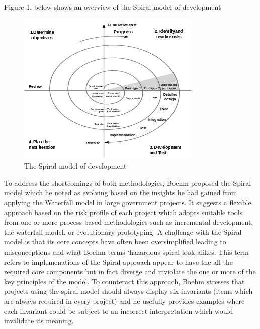 \documentclass[a4paper,12pt]{article}
\begin{document}
\begin{samepage}
\begin{samepage}
Figure 1. below shows an overview of the Spiral model of development

 \begin{figure}[h!]
  \includegraphics{spiralmodel.png}
  \caption{The Spiral model of development}
  \label{fig:spiral_model}
\end{figure}

To address the shortcomings of both methodologies, Boehm proposed the Spiral model which he noted as evolving based on the insights he had gained from applying the Waterfall model in large government projects.
It suggests a flexible approach based on the risk profile of each project which adopts suitable tools from one or more process based methodologies such as incremental development, the waterfall model, or evolutionary prototyping. A challenge with the Spiral model is that its core concepts have often been oversimplified leading to misconceptions and what Boehm terms `hazardous spiral look-alikes. This term refers to implemenations of the Spiral approach appear to have the all the required core components but in fact diverge and inviolate the one or more of the key principles of the model. To counteract this approach, Boehm stresses that projects using the spiral model should always display six invariants (items which are always required in every project) and he usefully provides examples where each invariant could be subject to an incorrect interpretation which would invalidate its meaning.

\begin{itemize}


\end{itemize}
\end{samepage}
\end{samepage}
\end{document}
